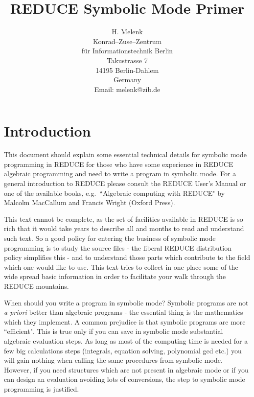 \newcommand{\reduce}{\small REDUCE}
\newcommand{\ttindex}[1]{\index{#1@{\tt #1}}}
\title{REDUCE Symbolic Mode Primer}
\date{}
\author{
H. Melenk \\[0.05in]
Konrad--Zuse--Zentrum \\
f\"ur Informationstechnik Berlin \\
Takustrasse 7 \\
14195 Berlin-Dahlem \\
Germany \\[0.05in]
Email:  melenk@zib.de \\[0.05in]}

\makeindex

\maketitle
\section{Introduction}

This document should explain some essential technical details for
symbolic mode programming in {\reduce} for those who
have some experience in {\reduce} algebraic programming
and need to write a program in symbolic mode. For a general
introduction to {\reduce} please consult the {\reduce} User's
Manual or one of the available books, e.g.\  ``Algebraic
computing with REDUCE" by Malcolm MacCallum and Francis
Wright (Oxford Press).

This text cannot be complete, as the set of facilities
available in {\reduce} is so rich that it would take years
to describe all and months to read and understand such text.
So a good policy for entering the business of symbolic mode
programming is to study the source files - the
liberal {\reduce} distribution policy simplifies this -
and to understand those parts which contribute to the
field which one would like to use. This text tries to
collect in one place some of the wide spread basic information
in order to facilitate your walk through the {\reduce} mountains.

When should you write a program in symbolic mode?
Symbolic programs are not {\it a priori} better than algebraic
programs - the essential thing is the mathematics which they
implement. A common prejudice is that symbolic programs
are more ``efficient". This is true only if you can
save in symbolic mode substantial algebraic evaluation
steps. As long as most of the
computing time is needed for a few big calculations steps
(integrals, equation solving, polynomial gcd etc.)
you will gain nothing when calling the same procedures
from symbolic mode. However, if you need structures
which are not present in algebraic mode or if you
can design an evaluation avoiding lots of conversions,
the step to symbolic mode programming is justified.

